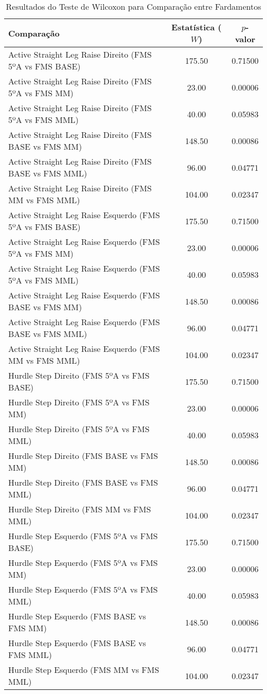 \begin{table}[H]
    \centering
    \caption{Resultados do Teste de Wilcoxon para Comparação entre Fardamentos}
    \label{tab:wilcoxon}
    \begin{tabular}{lcc}
        \hline
        \textbf{Comparação} & \textbf{Estatística ($W$)} & \textbf{$p$-valor} \\
        \hline
        Active Straight Leg Raise Direito (FMS 5ºA vs FMS BASE) & 175.50 & 0.71500 \\
        Active Straight Leg Raise Direito (FMS 5ºA vs FMS MM) & 23.00 & 0.00006 \\
        Active Straight Leg Raise Direito (FMS 5ºA vs FMS MML) & 40.00 & 0.05983 \\
        Active Straight Leg Raise Direito (FMS BASE vs FMS MM) & 148.50 & 0.00086 \\
        Active Straight Leg Raise Direito (FMS BASE vs FMS MML) & 96.00 & 0.04771 \\
        Active Straight Leg Raise Direito (FMS MM vs FMS MML) & 104.00 & 0.02347 \\
        Active Straight Leg Raise Esquerdo (FMS 5ºA vs FMS BASE) & 175.50 & 0.71500 \\
        Active Straight Leg Raise Esquerdo (FMS 5ºA vs FMS MM) & 23.00 & 0.00006 \\
        Active Straight Leg Raise Esquerdo (FMS 5ºA vs FMS MML) & 40.00 & 0.05983 \\
        Active Straight Leg Raise Esquerdo (FMS BASE vs FMS MM) & 148.50 & 0.00086 \\
        Active Straight Leg Raise Esquerdo (FMS BASE vs FMS MML) & 96.00 & 0.04771 \\
        Active Straight Leg Raise Esquerdo (FMS MM vs FMS MML) & 104.00 & 0.02347 \\
        Hurdle Step Direito (FMS 5ºA vs FMS BASE) & 175.50 & 0.71500 \\
        Hurdle Step Direito (FMS 5ºA vs FMS MM) & 23.00 & 0.00006 \\
        Hurdle Step Direito (FMS 5ºA vs FMS MML) & 40.00 & 0.05983 \\
        Hurdle Step Direito (FMS BASE vs FMS MM) & 148.50 & 0.00086 \\
        Hurdle Step Direito (FMS BASE vs FMS MML) & 96.00 & 0.04771 \\
        Hurdle Step Direito (FMS MM vs FMS MML) & 104.00 & 0.02347 \\
        Hurdle Step Esquerdo (FMS 5ºA vs FMS BASE) & 175.50 & 0.71500 \\
        Hurdle Step Esquerdo (FMS 5ºA vs FMS MM) & 23.00 & 0.00006 \\
        Hurdle Step Esquerdo (FMS 5ºA vs FMS MML) & 40.00 & 0.05983 \\
        Hurdle Step Esquerdo (FMS BASE vs FMS MM) & 148.50 & 0.00086 \\
        Hurdle Step Esquerdo (FMS BASE vs FMS MML) & 96.00 & 0.04771 \\
        Hurdle Step Esquerdo (FMS MM vs FMS MML) & 104.00 & 0.02347 \\
        \hline
    \end{tabular}
\end{table}

